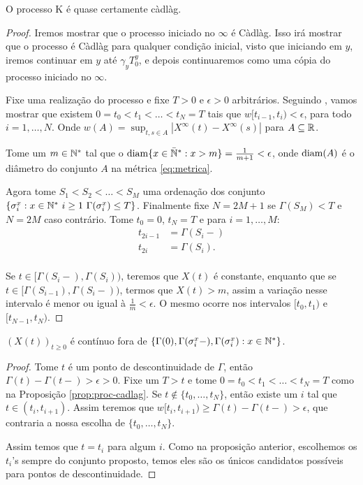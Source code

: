 \begin{proposicao}
  \label{prop:proc-cadlag}
  O processo K é quase certamente càdlàg.
\end{proposicao}
\begin{proof}

  Iremos mostrar que o processo iniciado no $\infty$ é Càdlàg. Isso
  irá mostrar que o processo é Càdlàg para qualquer condição inicial,
  visto que iniciando em $y$, iremos continuar em $y$ até $\gamma_y
  T^y_0$, e depois continuaremos como uma cópia do processo iniciado no
  $\infty$.

  Fixe uma realização do processo e fixe $T > 0$ e $\epsilon > 0$
  arbitrários. Seguindo \cite{billingsley:99}, vamos mostrar que
  existem $0 = t_0 < t_1 < \ldots < t_N = T$ tais que $w[t_{i-1}, t_i)
  < \epsilon$, para todo $i = 1, \ldots, N$. Onde $w(A) = \sup_{t, s
    \in A} |X^\infty(t) - X^\infty(s)|$ para $A \subseteq {\mathbb{R}}$.

  Tome um $m \in {\mathbb{N^*}}$ tal que o ${\mathrm{diam}}\{x \in {\mathbb{\bar{N}^*}}: x > m \} =
  \frac{1}{m+1} < \epsilon$, onde ${\mathrm{diam}}(A)$ é o diâmetro do conjunto
  $A$ na métrica \eqref{eq:metrica}.

  Agora tome $S_1 < S_2 < \ldots < S_M$ uma ordenação dos conjunto $\{
  \sigma^x_i: x \in {\mathbb{N^*}} \,\, i \geq 1 \,\, \Gamma(\sigma^x_i) \leq
  T\}$. Finalmente fixe $N = 2M+1$ se $\Gamma(S_M) < T$ e $N = 2M$
  caso contrário. Tome $t_0 = 0$, $t_N = T$ e para $i=1,\ldots, M$:
  \begin{align*}
    t_{2i-1} &= \Gamma(S_i-)\\
    t_{2i} &= \Gamma(S_i).\\
  \end{align*}

  Se $t \in [\Gamma(S_i-), \Gamma(S_i))$, teremos que
  $X(t)$ é constante, enquanto que se $t \in
  [\Gamma(S_{i-1}), \Gamma(S_{i}-))$, termos que
  $X(t) > m$, assim a variação nesse intervalo é menor ou igual
  à $\frac{1}{m} < \epsilon$. O mesmo ocorre nos intervalos $[t_0,
  t_1)$ e $[t_{N-1}, t_N)$.
\end{proof}

\begin{proposicao}
  \label{prop:proc-descontinuidades}
  $(X(t))_{t\geq 0}$ é \qc contínuo fora de $\{ \Gamma(0),
  \Gamma(\sigma_i^x-), \Gamma(\sigma_i^x): x \in {\mathbb{N^*}}\}$.
\end{proposicao}
\begin{proof}
  Tome $t$ é um ponto de descontinuidade de $\Gamma$, então $\Gamma(t) -
  \Gamma(t-) > \epsilon > 0$. Fixe um $T > t$ e tome $0 = t_0 < t_1 <
  \ldots < t_N = T$ como na Proposição \ref{prop:proc-cadlag}. Se
  $t \not\in \{t_0, \ldots, t_N\}$, então existe um $i$ tal que $t \in
  (t_i, t_{i+1})$. Assim teremos que $w[t_i, t_{i+1}) \geq \Gamma(t) -
  \Gamma(t-) > \epsilon$, que contraria a nossa escolha de $\{t_0,
  \ldots, t_N\}$.

  Assim temos que $t = t_i$ para algum $i$. Como na proposição
  anterior, escolhemos os $t_i$'s sempre do conjunto proposto, temos
  eles são os únicos candidatos possíveis para pontos de
  descontinuidade.
\end{proof}

